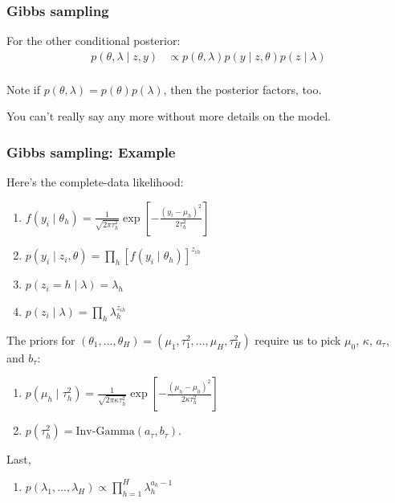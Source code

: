 \documentclass{beamer}
\begin{document}
\begin{frame}
\frametitle{Gibbs sampling}

For the other conditional posterior:
\begin{align*}
p(\theta, \lambda \mid z, y) &\propto p(\theta, \lambda )p(y \mid z, \theta)p(z \mid \lambda) \\
\end{align*}

Note if $p(\theta, \lambda) = p(\theta)p(\lambda)$, then the posterior factors, too. 
\newline

You can't really say any more without more details on the model. 

\end{frame}

\begin{frame}
\frametitle{Gibbs sampling: Example}

Here's the complete-data likelihood:

\begin{enumerate}
\item $f(y_i \mid \theta_h) = \frac{1}{\sqrt{2\pi \tau^2_{h} }}\exp\left[-\frac{(y_i - \mu_{h} )^2 }{ 2\tau^2_{h} } \right]$
\item $p(y_i \mid z_i, \theta) = \prod_{h} [f(y_i \mid \theta_h)]^{z_{ih}}$
\item $p(z_i = h \mid \lambda) = \lambda_h$
\item $p(z_i \mid \lambda) = \prod_h \lambda_h^{z_{ih}}$
\end{enumerate}
\pause

The priors for $(\theta_1, \ldots, \theta_H) = (\mu_1, \tau^2_1, \ldots, \mu_H, \tau^2_H)$ require us to pick $\mu_0$, $\kappa$, $a_{\tau}$, and $b_{\tau}$:
\begin{enumerate}
\item $p(\mu_h \mid \tau^2_{h}) = \frac{1}{\sqrt{2\pi \kappa \tau_h^2  }}\exp\left[-\frac{(\mu_{h} -  \mu_0)^2 }{ 2\kappa \tau_h^2 } \right]$
\item $p(\tau^2_{h}) = \text{Inv-Gamma}(a_{\tau}, b_{\tau})$.
\end{enumerate}
\pause

Last, 
\begin{enumerate}
\item $p(\lambda_1, \ldots, \lambda_H) \propto \prod_{h=1}^H \lambda_h^{a_h-1}$
\end{enumerate}

\end{frame}
\end{document}
